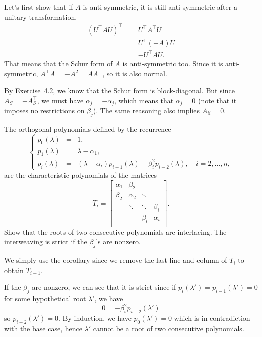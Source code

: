 \begin{solution}
	Let's first show that if $A$ is anti-symmetric,
	it is still anti-symmetric after a unitary transformation.
	\begin{align*}
	(U^\top AU)^\top
	& = U^\top A^\top U\\
	& = U^\top (-A)U\\
	& = -U^\top AU.
	\end{align*}
	That means that the Schur form of $A$ is anti-symmetric too.
	Since it is anti-symmetric, $A^\top A = -A^2 = AA^\top$, so it is also normal.
	
	By Exercise~4.2, we know that the Schur form is block-diagonal.
	But since $A_S = -A_S^\top$,
	we must have $\alpha_j = -\alpha_j$, which means that $\alpha_j = 0$
	(note that it imposes no restrictions on $\beta_j$).
	The same reasoning also implies $A_{ii} = 0$.
\end{solution}

The orthogonal polynomials defined by the recurrence
\[
\left\{\begin{array}{rcl}
p_0(\lambda) & = & 1,\\
p_1(\lambda) & = & \lambda - \alpha_1,\\
p_i(\lambda) & = & (\lambda - \alpha_i) p_{i-1}(\lambda) - \beta_i^2 p_{i-2}(\lambda), \quad i = 2, \dots, n,
\end{array}\right.
\]
are the characteristic polynomials of the matrices
\[
T_i = \begin{bmatrix}
\alpha_1 & \beta_2 & & \\
\beta_2 & \alpha_2 & \ddots &\\
& \ddots & \ddots & \beta_i\\
& & \beta_i & \alpha_i \\
\end{bmatrix}.
\]
Show that the roots of two consecutive polynomials are interlacing.
The interweaving is strict if the \(\beta_j\)'s are nonzero.

\begin{solution}
	We simply use the corollary since we remove the last line and column of \(T_i\) to obtain \(T_{i-1}\).
	
	If the $\beta_j$ are nonzero, we can see that it is strict since
	if $p_i(\lambda') = p_{i-1}(\lambda') = 0$ for some hypothetical root \(\lambda'\), we have
	\[ 0 = -\beta_i^2 p_{i-2}(\lambda') \]
	so $p_{i-2}(\lambda') = 0$.
	By induction, we have $p_0(\lambda') = 0$ which is in contradiction with the base case, hence \(\lambda'\) cannot be a root of two consecutive polynomials.
\end{solution}

